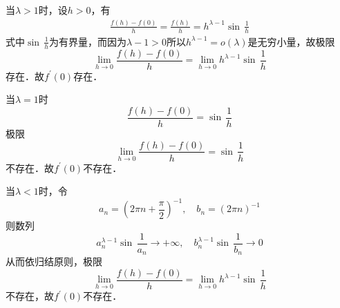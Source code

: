 \prove 当$\lambda > 1$时，设$h > 0$，有
\begin{align}
    \frac{f(h)-f(0)}{h} = \frac{f(h)}{h} = h^{\lambda-1} \sin \, \frac{1}{h}
\end{align}
式中$\sin \, \displaystyle\frac{1}{h}$为有界量，而因为$\lambda-1>0$所以$h^{\lambda-1}=o(\lambda)$是无穷小量，故极限
\begin{equation}
    \lim_{h \to 0} \frac{f(h)-f(0)}{h} = \lim_{h \to 0} h^{\lambda - 1} \sin \, \frac{1}{h}
\end{equation}
存在．故$f^{\prime}(0)$存在．

当$\lambda = 1$时
\begin{equation}
    \frac{f(h)-f(0)}{h} = \sin \, \frac{1}{h}
\end{equation}
极限
\begin{equation}
    \lim_{h \to 0} \frac{f(h)-f(0)}{h} = \sin \, \frac{1}{h}
\end{equation}
不存在．故$f^{\prime}(0)$不存在．


当$\lambda < 1$时，令
\begin{equation}
    a_n = \left(2\pi n + \frac{\pi}{2}\right)^{-1}, \quad b_n = \left(2 \pi n\right)^{-1}
\end{equation}
则数列
\begin{equation}
    a_n^{\lambda-1} \sin \, \frac{1}{a_n} \to +\infty, \quad b_n^{\lambda - 1} \sin \, \frac{1}{b_n} \to 0
\end{equation}
从而依归结原则，极限
\begin{equation}
    \lim_{h \to 0} \frac{f(h)-f(0)}{h} = \lim_{h \to 0} h^{\lambda - 1} \sin \, \frac{1}{h}
\end{equation}
不存在，故$f^{\prime}(0)$不存在．